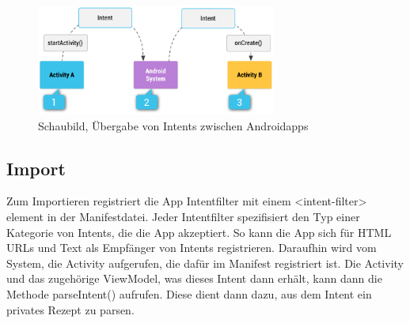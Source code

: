 \begin{figure}[H]
\centering
\includegraphics[width=0.7\textwidth]{pics/android_arch_intentfilter.png}%
\caption{Schaubild, Übergabe von Intents zwischen Androidapps \cite{AndroidArchitectureComponents}}%
\label{arch_intentfilter}%
\end{figure}


\subsection{Import} 
Zum Importieren registriert die App Intentfilter mit einem <intent-filter> element in der Manifestdatei. Jeder Intentfilter spezifisiert den Typ einer Kategorie von Intents, die die App akzeptiert. So kann die App sich für HTML URLs und Text als Empfänger von Intents registrieren. Daraufhin wird vom System, die Activity aufgerufen, die dafür im Manifest registriert ist. Die Activity und das zugehörige ViewModel, was  dieses Intent dann erhält, kann dann die Methode parseIntent() aufrufen. 
Diese dient dann dazu, aus dem Intent ein privates Rezept zu parsen. 
